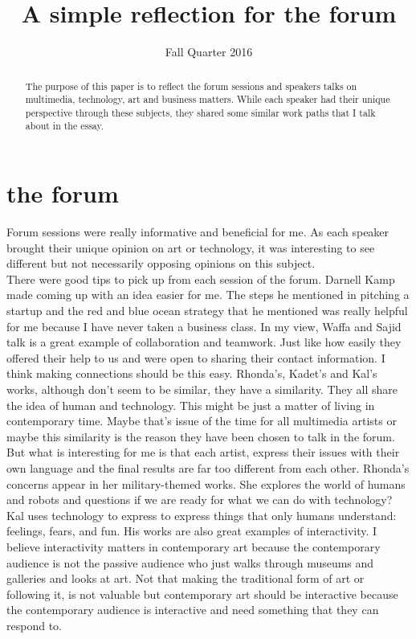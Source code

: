 \documentclass[letterpaper]{article}
\title{A simple reflection for the forum}
\author{}
\date{Fall Quarter 2016}
\begin{document}
\maketitle
\begin{abstract}
The purpose of this paper is to reflect the forum sessions and speakers talks on multimedia, technology, art and business matters. While each speaker had their unique perspective through these subjects, they shared some similar work paths that I talk about in the essay.
\end{abstract}

\section{the forum}
Forum sessions were really informative and beneficial for me. As each speaker brought their unique opinion on art or technology, it was interesting to see different but not necessarily opposing opinions on this subject.\\
There were good tips to pick up from each session of the forum. Darnell Kamp made coming up with an idea easier for me. The steps he mentioned in pitching a startup and the red and blue ocean strategy that he mentioned was really helpful for me because I have never taken a business class.
In my view, Waffa and Sajid talk is a great example of collaboration and teamwork. Just like how easily they offered their help to us and were open to sharing their contact information. I think making connections should be this easy.
Rhonda’s, Kadet’s and Kal’s works, although don’t seem to be similar, they have a similarity. They all share the idea of human and technology. This might be just a matter of living in contemporary time. Maybe that’s issue of the time for all multimedia artists or maybe this similarity is the reason they have been chosen to talk in the forum. But what is interesting for me is that each artist, express their issues with their own language and the final results are far too different from each other.
Rhonda’s concerns appear in her military-themed works. She explores the world of humans and robots and questions if we are ready for what we can do with technology? Kal uses technology to express to express things that only humans understand: feelings, fears, and fun. His works are also great examples of interactivity. 
I believe interactivity matters in contemporary art because the contemporary audience is not the passive audience who just walks through museums and galleries and looks at art. Not that making the traditional form of art or following it, is not valuable but contemporary art should be interactive because the contemporary audience is interactive and need something that they can respond to.
\end{document}
